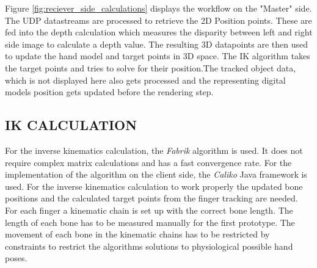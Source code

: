 Figure \ref{fig:reciever_side_calculations} displays the workflow on the "Master" side. The UDP datastreams are processed to retrieve the 2D Position points. These are fed into the depth calculation which measures the disparity between left and right side image to calculate a depth value\cite{JernejMrovlje.2008,YasirDawoodSalman.2017,Tauer.2010}. The resulting 3D datapoints are then used to update the hand model and target points in 3D space. The IK algorithm takes the target points and tries to solve for their position.The tracked object data, which is not displayed here also gets processed and the representing digital models position gets updated before the rendering step.
\subsection{IK CALCULATION}
For the inverse kinematics calculation, the \textit{Fabrik} algorithm is used. It does not require complex matrix calculations and has a fast convergence rate. For the implementation of the algorithm on the client side, the \textit{Caliko} Java framework\cite{Lansley.2016} is used. 
For the inverse kinematics calculation to work properly the updated bone positions and the calculated target points from the finger tracking are needed.
For each finger a kinematic chain is set up with the correct bone length. The length of each bone has to be measured manually for the first prototype. The movement of each bone in the kinematic chains has to be restricted by constraints to restrict the algorithms solutions to physiological possible hand poses.  